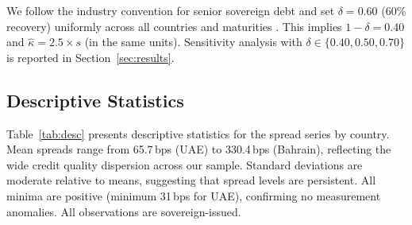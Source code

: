 \documentclass[12pt]{article}
\theoremstyle{plain}
\theoremstyle{definition}
\theoremstyle{remark}
\begin{document}
We follow the industry convention for senior sovereign debt and set
$\delta = 0.60$ (60\% recovery) uniformly across all countries and
maturities \citep{DuffieSingleton1999}. This implies $1 - \delta = 0.40$ and
$\hat{\kappa} = 2.5 \times s$ (in the same units). Sensitivity analysis with
$\delta \in \{0.40, 0.50, 0.70\}$ is reported in Section~\ref{sec:results}.

\subsection{Descriptive Statistics}

Table~\ref{tab:desc} presents descriptive statistics for the spread series by
country. Mean spreads range from 65.7\,bps (UAE) to 330.4\,bps (Bahrain),
reflecting the wide credit quality dispersion across our sample. Standard
deviations are moderate relative to means, suggesting that spread levels are
persistent. All minima are positive (minimum 31\,bps for UAE), confirming no
measurement anomalies. All observations are sovereign-issued.
\end{document}
